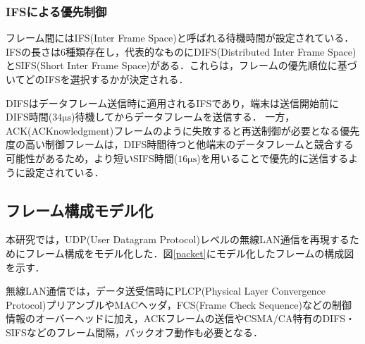\documentclass[a4paper, 10pt]{ltjsarticle}
\begin{document}
\vspace{-3em}

\subsubsection{IFSによる優先制御}

フレーム間にはIFS(Inter Frame Space)と呼ばれる待機時間が設定されている．IFSの長さは6種類存在し，代表的なものにDIFS(Distributed Inter Frame Space)とSIFS(Short Inter Frame Space)がある．これらは，フレームの優先順位に基づいてどのIFSを選択するかが決定される．

DIFSはデータフレーム送信時に適用されるIFSであり，端末は送信開始前にDIFS時間($34\mathrm{\mu s}$)待機してからデータフレームを送信する．
一方，ACK(ACKnowledgment)フレームのように失敗すると再送制御が必要となる優先度の高い制御フレームは，DIFS時間待つと他端末のデータフレームと競合する可能性があるため，より短いSIFS時間($16\mathrm{\mu s}$)を用いることで優先的に送信するように設定されている．





\subsection{フレーム構成モデル化}

本研究では，UDP(User Datagram Protocol)レベルの無線LAN通信を再現するためにフレーム構成をモデル化した．図\ref{packet}にモデル化したフレームの構成図を示す．


無線LAN通信では，データ送受信時にPLCP(Physical
Layer Convergence Protocol)プリアンブルやMACヘッダ，FCS(Frame Check Sequence)などの制御情報のオーバーヘッドに加え，ACKフレームの送信やCSMA/CA特有のDIFS・SIFSなどのフレーム間隔，バックオフ動作も必要となる．
\end{document}
